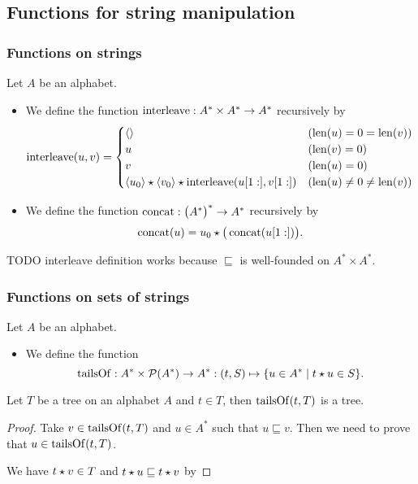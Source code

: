 \subsection{Functions for string manipulation}
\subsubsection{Functions on strings}
\begin{definition}
Let $A$ be an alphabet.
\begin{itemize}
\item We define the \udef{$\strInterleave$} function $\operatorname{interleave}: A^*\times A^* \to A^*$ recursively by
\[ \operatorname{interleave}(u,v) = \begin{cases}
\left\langle  \right\rangle & (\operatorname{len}(u) = 0 = \operatorname{len}(v)) \\
u & (\operatorname{len}(v) = 0) \\
v & (\operatorname{len}(u) = 0) \\
\left\langle u_0 \right\rangle\star \left\langle v_0 \right\rangle\star \operatorname{interleave}(u[1:], v[1:]) & (\operatorname{len}(u) \neq 0 \neq \operatorname{len}(v))
\end{cases} \]
\item We define the \udef{$\strConcat$} function $\operatorname{concat}: \big(A^*\big)^* \to A^*$ recursively by
\[ \operatorname{concat}(u) = u_0 \star \big(\operatorname{concat}(u[1:])\big). \]
\end{itemize}
\end{definition}
TODO interleave definition works because $\sqsubseteq$ is well-founded on $A^*\times A^*$.

\subsubsection{Functions on sets of strings}
\begin{definition}
Let $A$ be an alphabet.
\begin{itemize}
\item We define the \udef{$\tailsOf$} function
\[ \tailsOf: A^* \times \powerset(A^*) \to A^*: (t, S) \mapsto \setbuilder{u\in A^*}{t\concat u \in S}. \]
\end{itemize}
\end{definition}

\begin{lemma}
Let $T$ be a tree on an alphabet $A$ and $t\in T$, then $\operatorname{tailsOf}(t, T)$ is a tree.
\end{lemma}
\begin{proof}
Take $v \in \operatorname{tailsOf}(t, T)$ and $u\in A^*$ such that $u\sqsubseteq v$. Then we need to prove that $u\in \operatorname{tailsOf}(t, T)$.

We have $t\star v \in T$ and $t\star u \sqsubseteq t\star v$ by 
\end{proof}




